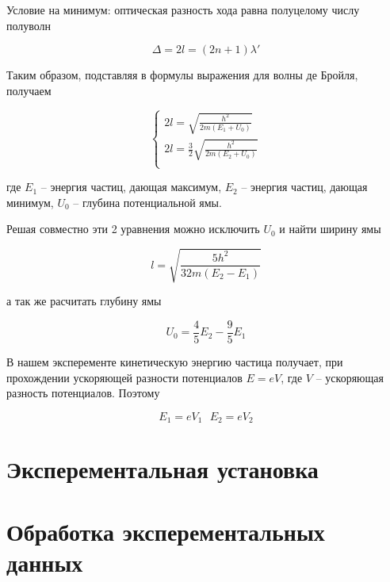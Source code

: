     Условие на минимум: оптическая разность хода равна полуцелому числу полуволн

    \begin{equation}
        \Delta = 2l = (2n + 1) \lambda'
    \end{equation}

    Таким образом, подставляя в формулы выражения для волны де Бройля, получаем

    \begin{equation}
        \begin{cases}
            2l = \sqrt{\frac{h^2}{2m (E_1 + U_0)}} \\
            2l = \frac{3}{2} \sqrt{\frac{h^2}{2m (E_2 + U_0)}} \\
        \end{cases}
    \end{equation}

    где $E_1$ -- энергия частиц, дающая максимум, $E_2$ -- энергия частиц, дающая минимум, $U_0$ -- глубина потенциальной ямы.

    Решая совместно эти 2 уравнения можно исключить $U_0$ и найти ширину ямы

    \begin{equation} \label{eq:width}
        l = \sqrt{\frac{5 h^2}{32 m (E_2 - E_1)}}
    \end{equation}

    а так же расчитать глубину ямы

    \begin{equation} \label{eq:U_0}
        U_0 = \frac{4}{5}E_2 - \frac{9}{5}E_1
    \end{equation}

    В нашем эксперементе кинетическую энергию частица получает, при прохождении ускоряющей разности потенциалов $E = e V$, 
    где $V$ -- ускоряющая разность потенциалов. Поэтому

    \[ E_1 = e V_1 ~~~ E_2 = e V_2 \]

    \section*{Эксперементальная установка}

    \section*{Обработка эксперементальных данных}

